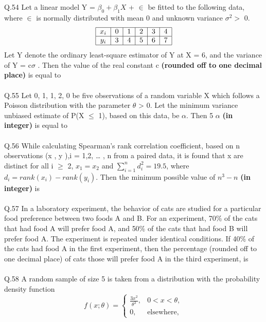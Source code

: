 \documentclass{book}[200pt]
\begin{document}
\\
\\
Q.54 Let a linear model Y = $ \beta_0 + \beta_1X$ + $\in$ be fitted to the following data, where $\in$ is
normally distributed with mean 0 and unknown variance $\sigma^2 > $ 0. \[
\begin{tabular}{|c|c|c|c|c|c|}
	\hline
	$x_i$ & 0 & 1& 2 & 3 & 4 \\
	\hline
	$y_i$ & 3 & 4 & 5 & 6 & 7 \\
	\hline
\end{tabular}
\]
Let Y denote the ordinary least-square estimator of Y at X = 6, and the variance of Y = c$\sigma$ . Then the value of the real constant c \textbf{(rounded off to one decimal
place)} is equal to \underline{\hspace{2cm}}\\
\\
Q.55 Let 0, 1, 1, 2, 0 be five observations of a random variable X which follows a Poisson
distribution with the parameter $\theta$ > 0. Let the minimum variance unbiased estimate
of P(X $\leq$ 1), based on this data, be $\alpha$. Then 5 $\alpha$ \textbf{(in integer)} is equal to \underline{\hspace{2cm}}\\
\\
Q.56 While calculating Spearman’s rank correlation coefficient, based on n observations {(x , y ),i = 1,2, … , n} from a paired data, it is found that x are distinct for all i $\geq$ 2, $x_1 = x_2$ and $\sum_{i=1}^{n}d^2_i = 19.5$, where $d_i = rank(x_i) - rank(y_i)$. Then the minimum possible value of $n^3 - n$ \textbf{(in integer)} is \underline{\hspace{2cm}} \\
\\
Q.57 In a laboratory experiment, the behavior of cats are studied for a particular food preference between two foods A and B. For an experiment, 70\% of the cats that had food A will prefer food A, and 50\% of the cats that had food B will prefer food A. The experiment is repeated under identical conditions. If 40\% of the cats had food A in the first experiment, then the percentage (rounded off to one decimal place) of cats those will prefer food A in the third experiment, is \underline{\hspace{2cm}}\\
\\
Q.58 A random sample of size 5 is taken from a distribution with the probability density function
\[
f(x; \theta) =
\begin{cases}
	\frac{3x^2}{\theta^3}, & 0 < x < \theta, \\
	0, & \text{elsewhere},
\end{cases}
\]
\end{document}
